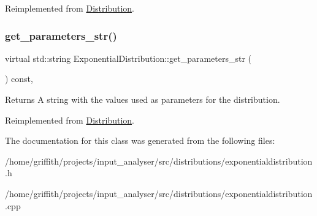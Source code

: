 Reimplemented from \hyperlink{classDistribution_a478a0c7b72d3ad266a2b6f1b9ed20fe9}{Distribution}.

\mbox{\label{classExponentialDistribution_aa6f3a3208a0ec5f4b7f5fa8a36938c89}} 
\subsubsection{\texorpdfstring{get\+\_\+parameters\+\_\+str()}{get\_parameters\_str()}}
{\footnotesize\ttfamily virtual std\+::string Exponential\+Distribution\+::get\+\_\+parameters\+\_\+str (\begin{DoxyParamCaption}{ }\end{DoxyParamCaption}) const\hspace{0.3cm}{\ttfamily [inline]}, {\ttfamily [virtual]}}

\begin{DoxyReturn}{Returns}
A string with the values used as parameters for the distribution. 
\end{DoxyReturn}


Reimplemented from \hyperlink{classDistribution_a716b7df9facb6bb016f46ac130297f9c}{Distribution}.



The documentation for this class was generated from the following files\+:\begin{DoxyCompactItemize}
\item 
/home/griffith/projects/input\+\_\+analyser/src/distributions/exponentialdistribution.\+h\item 
/home/griffith/projects/input\+\_\+analyser/src/distributions/exponentialdistribution.\+cpp\end{DoxyCompactItemize}

